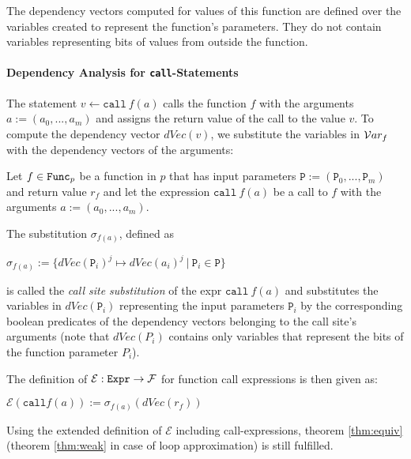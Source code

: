 The dependency vectors computed for values of this function are defined over the variables created to represent the function's parameters. They do not contain variables representing bits of values from outside the function.

\paragraph{Dependency Analysis for \texttt{call}-Statements}
The statement $v \leftarrow \mathtt{call} \: f(a)$ calls the function $f$ with the arguments $a := (a_0,..., a_m)$ and assigns the return value of the call to the value $v$. To compute the dependency vector $dVec(v)$, we substitute the variables in $\mathcal{V}ar_f$ with the dependency vectors of the arguments:

\begin{definition}\label{def:callsiteSub}
    Let $f \in \mathtt{Func}_p$ be a function in $p$ that has input parameters $\mathtt{P} := (\mathtt{P}_0,...,\mathtt{P}_m)$ and return value $r_f$ and let the expression $\mathtt{call} \: f(a)$ be a call to $f$ with the arguments $a := (a_0,..., a_m)$.
    
    The substitution $\sigma_{f(a)}$, defined as
    \begin{center}
        $\sigma_{f(a)} := \{ dVec(\mathtt{P}_i)^j \mapsto dVec(a_i)^j \: |  \: \mathtt{P}_i \in \mathtt{P}\}$
    \end{center}
    is called the \emph{call site substitution} of the expr $\mathtt{call} \: f(a)$ and substitutes the variables in $dVec(\mathtt{P}_i)$ representing the input parameters $\mathtt{P}_i$ by the corresponding boolean predicates of the dependency vectors belonging to the call site's arguments (note that $dVec(P_i)$ contains only variables that represent the bits of the function parameter $P_i$).
    
    The definition of $\mathcal{E}: \mathtt{Expr} \to \mathcal{F}$ for function call expressions is then given as:
    \begin{center}
        $\mathcal{E}(\mathtt{call} f(a)) := \sigma_{f(a)} (dVec(r_f))$
    \end{center}
\end{definition}

\begin{lemma}
Using the extended definition of $\mathcal{E}$ including call-expressions, theorem \ref{thm:equiv} (theorem \ref{thm:weak} in case of loop approximation) is still fulfilled.
\end{lemma}


